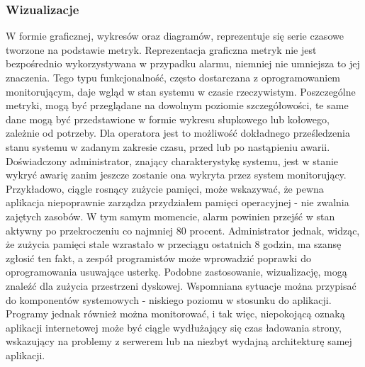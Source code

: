         \subsubsection{Wizualizacje}
        W formie graficznej, wykresów oraz diagramów, reprezentuje się serie czasowe tworzone na podstawie metryk. Reprezentacja graficzna metryk nie jest bezpośrednio wykorzystywana w przypadku alarmu,
        niemniej nie umniejsza to jej znaczenia. Tego typu funkcjonalność, często dostarczana z oprogramowaniem
        monitorującym, daje wgląd w stan systemu w czasie rzeczywistym. Poszczególne metryki, mogą być
        przeglądane na dowolnym poziomie szczegółowości, te same dane mogą być przedstawione w formie
        wykresu słupkowego lub kołowego, zależnie od potrzeby. Dla operatora jest
        to możliwość dokładnego prześledzenia stanu systemu w zadanym zakresie czasu, przed lub po
        nastąpieniu awarii. Doświadczony administrator, znający charakterystykę systemu, jest w stanie
        wykryć awarię zanim jeszcze zostanie ona wykryta przez system monitorujący. Przykładowo, ciągle
        rosnący zużycie pamięci, może wskazywać, że pewna aplikacja niepoprawnie zarządza przydziałem
        pamięci operacyjnej - nie zwalnia zajętych zasobów. W tym samym momencie, alarm powinien przejść
        w stan aktywny po przekroczeniu co najmniej 80 procent. Administrator jednak, widząc, że zużycia pamięci
        stale wzrastało w przeciągu ostatnich 8 godzin, ma szansę zgłosić ten fakt, a zespół programistów
        może wprowadzić poprawki do oprogramowania usuwające usterkę. Podobne zastosowanie, wizualizację,
        mogą znaleźć dla zużycia przestrzeni dyskowej. Wspomniana sytuacje można przypisać do komponentów
        systemowych - niskiego poziomu w stosunku do aplikacji. Programy jednak również można monitorować,
        i tak więc, niepokojącą oznaką aplikacji internetowej może być ciągle wydłużający się czas 
        ładowania strony, wskazujący na problemy z serwerem lub na niezbyt wydajną architekturę samej aplikacji. 